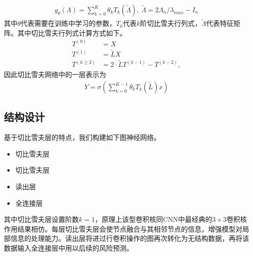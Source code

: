 \begin{equation}\begin{aligned}
g_{\theta}(\Lambda)=\sum_{k=0}^{K}\theta_kT_k(\tilde{\Lambda}),\ \tilde{\Lambda}=2\Lambda_n/\lambda_{max}-I_n
\end{aligned}\end{equation}
其中$\theta$代表需要在训练中学习的参数，$T_k$代表$k$阶切比雪夫行列式，$\tilde{\Lambda}$代表特征矩阵。其中切比雪夫行列式计算方式如下。
\begin{equation}\begin{aligned}
T^{(0)} &= X \\
T^{(1)} &= \tilde L X \\
T^{(k \ge 2)} &= 2 \cdot \tilde L T^{(k - 1)} - T^{(k - 2)},
\end{aligned}\end{equation}
因此切比雪夫网络中的一层表示为
\begin{equation}\begin{aligned}
Y=\sigma \left(  \sum_{k=0}^{K-1}{\theta_k T_k (\tilde{L})}   x \right) 
\end{aligned}\end{equation}

\subsection{结构设计}

基于切比雪夫层的特点，我们构建如下图神经网络。

\begin{itemize}
\item
  切比雪夫层
\item
  切比雪夫层
\item
  读出层
\item
  全连接层
\end{itemize}

其中切比雪夫层设置阶数$k=1$，原理上该型卷积核同CNN中最经典的$3\times3$卷积核作用结果相仿。每层切比雪夫层会使节点融合与其相邻节点的信息，增强模型对局部信息的处理能力。读出层将进过行卷积操作的图再次转化为无结构数据，再将该数据输入全连接层中用以后续的风险预测。
